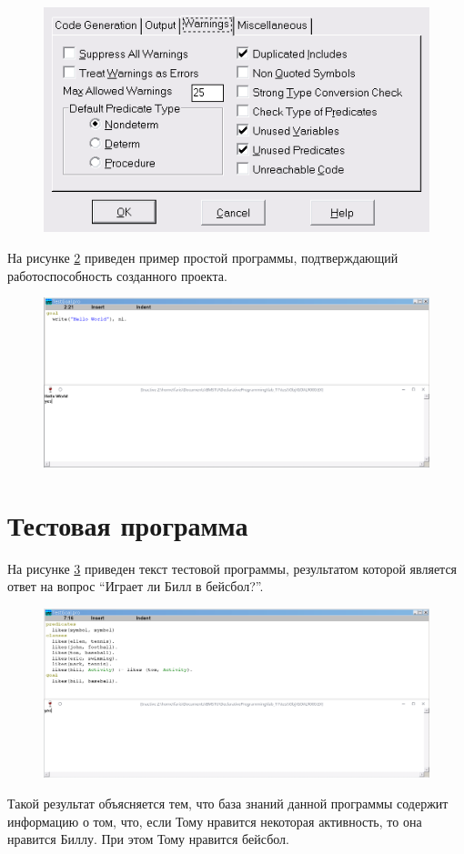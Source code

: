 \begin{figure}[H]
    \centering
    \includegraphics[scale=.7]{imgs/warnings.png}
    \caption{}
    \label{img:warnings}
\end{figure}

На рисунке \ref{img:first} приведен пример простой программы, подтверждающий работоспособность созданного проекта.
\begin{figure}[H]
    \centering
    \includegraphics[scale=.5]{imgs/first.png}
    \caption{}
    \label{img:first}
\end{figure}

\section{Тестовая программа}
На рисунке \ref{img:test} приведен текст тестовой программы, результатом которой является ответ на вопрос ``Играет ли Билл в бейсбол?''.
\begin{figure}[H]
    \centering
    \includegraphics[scale=.5]{imgs/test.png}
    \caption{}
    \label{img:test}
\end{figure}
Такой результат объясняется тем, что база знаний данной программы содержит информацию о том, что, если Тому нравится некоторая активность, то она нравится Биллу. При этом Тому нравится бейсбол.

